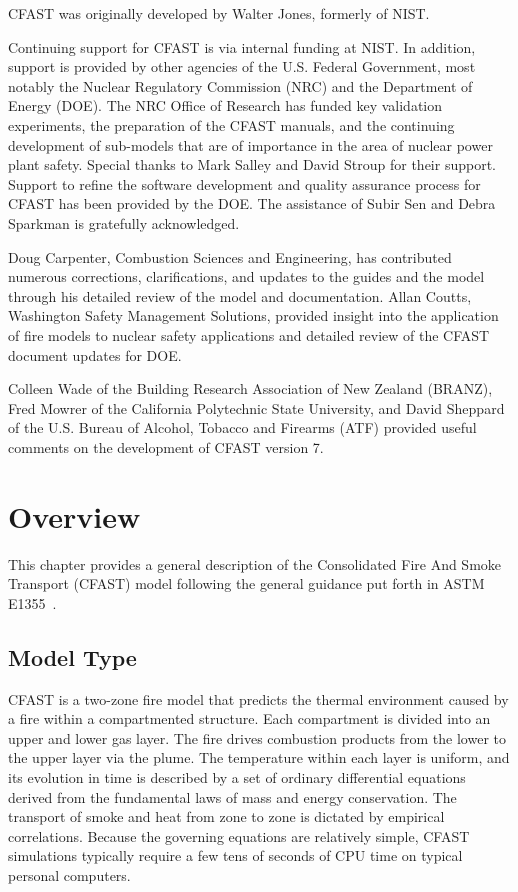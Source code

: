 \documentclass[12pt]{book}
\begin{document}
\label{acksection}

CFAST was originally developed by Walter Jones, formerly of NIST.

Continuing support for CFAST is via internal funding at NIST. In addition, support is provided by other agencies of the U.S. Federal Government, most notably the Nuclear Regulatory Commission (NRC) and the Department of Energy (DOE). The NRC Office of Research has funded key validation experiments, the preparation of the CFAST manuals, and the continuing development of sub-models that are of importance in the area of nuclear power plant safety. Special thanks to Mark Salley and David Stroup for their support. Support to refine the software development and quality assurance process for CFAST has been provided by the DOE. The assistance of Subir Sen and Debra Sparkman is gratefully acknowledged.

Doug Carpenter, Combustion Sciences and Engineering, has contributed numerous corrections, clarifications, and updates to the guides and the model through his detailed review of the model and documentation. Allan Coutts, Washington Safety Management Solutions, provided insight into the application of fire models to nuclear safety applications and detailed review of the CFAST document updates for DOE.

Colleen Wade of the Building Research Association of New Zealand (BRANZ), Fred Mowrer of the California Polytechnic State University, and David Sheppard of the U.S. Bureau of Alcohol, Tobacco and Firearms (ATF) provided useful comments on the development of CFAST version 7.


\tableofcontents

\listoffigures


\mainmatter

\chapter{Overview}

This chapter provides a general description of the Consolidated Fire And Smoke Transport (CFAST) model following the general guidance put forth in ASTM E1355~\cite{ASTM:E1355}.

\section{Model Type}

CFAST is a two-zone fire model that predicts the thermal environment caused by a fire within a compartmented structure. Each compartment is divided into an upper and lower gas layer. The fire drives combustion products from the lower to the upper layer via the plume. The temperature within each layer is uniform, and its evolution in time is described by a set of ordinary differential equations derived from the fundamental laws of mass and energy conservation. The transport of smoke and heat from zone to zone is dictated by empirical correlations. Because the governing equations are relatively simple, CFAST simulations typically require a few tens of seconds of CPU time on typical personal computers.
\end{document}
